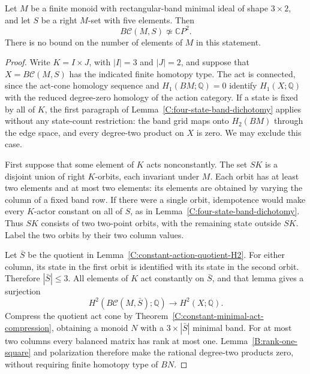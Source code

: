 \begin{theorem}
\label{C:five-state-three-by-two-cones}
Let $M$ be a finite monoid with rectangular-band minimal ideal
of shape $3\times2$, and let $S$ be a right $M$-set with five
elements.  Then
\[
 B\mathcal C(M,S)\not\simeq\mathbb CP^2.
\]
There is no bound on the number of elements of $M$ in this statement.
\end{theorem}
\begin{proof}
Write $K=I\times J$, with $|I|=3$ and $|J|=2$, and suppose
that $X=B\mathcal C(M,S)$ has the indicated finite homotopy type.
The act is connected, since the act-cone homology sequence and
$H_1(BM;\mathbb Q)=0$ identify $H_1(X;\mathbb Q)$ with the
reduced degree-zero homology of the action category.
If a state is fixed by all of $K$, the first paragraph of
Lemma~\ref{C:four-state-band-dichotomy} applies without any
state-count restriction: the band grid maps onto $H_2(BM)$
through the edge space, and every degree-two product on $X$
is zero.  We may exclude this case.

First suppose that some element of $K$ acts nonconstantly.
The set $SK$ is a disjoint union of right $K$-orbits, each
invariant under $M$.  Each orbit has at least two elements and
at most two elements: its elements are obtained by varying the
column of a fixed band row.  If there were a single orbit,
idempotence would make every $K$-actor constant on all of $S$,
as in Lemma~\ref{C:four-state-band-dichotomy}.  Thus $SK$
consists of two two-point orbits, with the remaining state
outside $SK$.  Label the two orbits by their two column values.

Let $\bar S$ be the quotient in
Lemma~\ref{C:constant-action-quotient-H2}.  For either column,
its state in the first orbit is identified with its state in
the second orbit.  Therefore $|\bar S|\leq3$.
All elements of $K$ act constantly on $\bar S$, and that lemma
gives a surjection
\[
 H^2(B\mathcal C(M,\bar S);\mathbb Q)
       \longrightarrow H^2(X;\mathbb Q).
\]
Compress the quotient act cone by
Theorem~\ref{C:constant-minimal-act-compression}, obtaining
a monoid $N$ with a $3\times|\bar S|$ minimal band.
For at most two columns every balanced matrix has rank at most
one.  Lemma~\ref{B:rank-one-square} and polarization therefore
make the rational degree-two products zero, without requiring
finite homotopy type of $BN$.


\end{proof}
